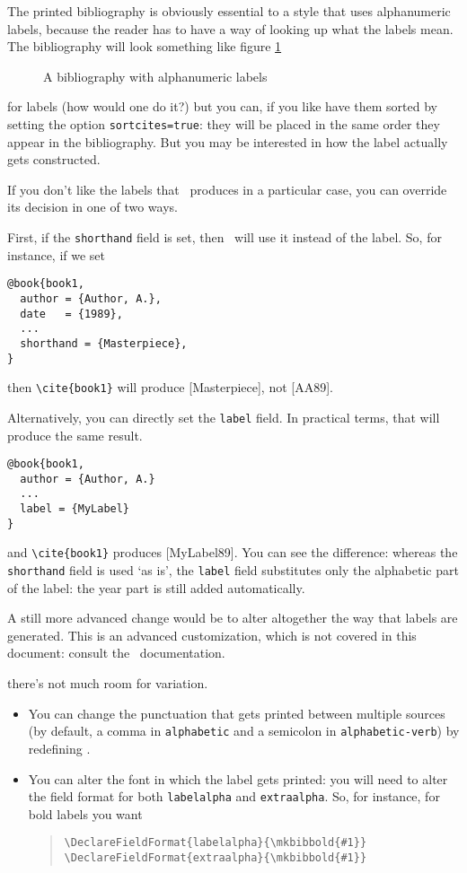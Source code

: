 The printed bibliography is obviously essential to a style that uses
alphanumeric labels, because the reader has to have a way of looking
up what the labels mean. The bibliography will look something like
figure \ref{example:bibliography:alphabetic}

\begin{figure}
\caption{A bibliography with alphanumeric
  labels\label{example:bibliography:alphabetic}}
\end{figure}

 for labels (how
would one do it?) but you can, if you like have them sorted by setting
the option \verb|sortcites=true|: they will be placed in the same
order they appear in the bibliography. But you may be interested in
how the label actually gets constructed.

If you don't like the labels that \biblatex\ produces in a particular
case, you can override its decision in one of two ways.

First, if the \verb|shorthand| field is set, then \biblatex\ will use
it instead of the label. So, for instance, if we set
\begin{verbatim}
@book{book1,
  author = {Author, A.},
  date   = {1989},
  ...
  shorthand = {Masterpiece},
}
\end{verbatim}
then \verb|\cite{book1}| will produce [Masterpiece], not [AA89].

Alternatively, you can directly set the \verb|label| field. In
practical terms, that will produce the same result.
\begin{verbatim}
@book{book1,
  author = {Author, A.} 
  ...
  label = {MyLabel}
}
\end{verbatim}
and \verb|\cite{book1}| produces [MyLabel89]. You can see the difference:
whereas the \verb|shorthand| field is used `as is', the \verb|label|
field substitutes only the alphabetic part of the label: the year part
is still added automatically.

A still more advanced change would be to alter altogether the way that
labels are generated. This is an advanced customization, which is not
covered in this document: consult the \biblatex\ documentation.

 there's not much room for
variation.
\begin{itemize}
\item You can change the punctuation that gets printed between
multiple sources (by default, a comma in \verb|alphabetic| and a
semicolon in \verb|alphabetic-verb|) by redefining
.
\item You can alter the font in which the label gets printed: you will
  need to alter the field format for both \verb|labelalpha| and
  \verb|extraalpha|. So, for instance, for bold labels you want
\begin{quote}
\verb|\DeclareFieldFormat{labelalpha}{\mkbibbold{#1}}|\\
\verb|\DeclareFieldFormat{extraalpha}{\mkbibbold{#1}}|
\end{quote}
\end{itemize}

